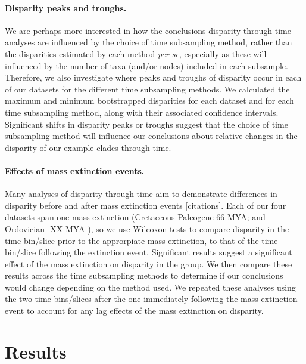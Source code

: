 \documentclass[12pt,a4paper]{article}
\begin{document}
\paragraph{Disparity peaks and troughs.}
We are perhaps more interested in how the conclusions disparity-through-time analyses are influenced by the choice of time subsampling method, rather than the disparities estimated by each method \textit{per se}, especially as these will influenced by the number of taxa (and/or nodes) included in each subsample. 
Therefore, we also investigate where peaks and troughs of disparity occur in each of our datasets for the different time subsampling methods. 
We calculated the maximum and minimum bootstrapped disparities for each dataset and for each time subsampling method, along with their associated confidence intervals.
Significant shifts in disparity peaks or troughs suggest that the choice of time subsampling method will influence our conclusions about relative changes in the disparity of our example clades through time. 

\paragraph{Effects of mass extinction events.}
Many analyses of disparity-through-time aim to demonstrate differences in disparity before and after mass extinction events [citations]. 
Each of our four datasets span one mass extinction (Cretaceous-Paleogene 66 MYA; \cite{brusatte2014gradual,bapst2016topology,beckancient2014} and Ordovician- XX MYA \cite{wright2017bayesian}), so we use Wilcoxon tests to compare disparity in the time bin/slice prior to the approrpiate mass extinction, to that of the time bin/slice following the extinction event. 
Significant results suggest a significant effect of the mass extinction on disparity in the group.
We then compare these results across the time subsampling methods to determine if our conclusions would change depending on the method used.
We repeated these analyses using the two time bins/slices after the one immediately following the mass extinction event to account for any lag effects of the mass extinction on disparity.

\section{Results} 

\end{document}
